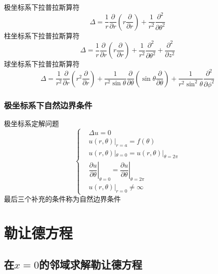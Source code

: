 \documentclass{article}
\begin{document}
极坐标系下拉普拉斯算符
\begin{equation*}
  \Delta = \dfrac{1}{r} \dfrac{\partial}{\partial r} \left( r \dfrac{\partial}{\partial r}  \right) + \dfrac{1}{r^{2}} \dfrac{\partial^{2}}{\partial \theta^{2}} 
\end{equation*}
柱坐标系下拉普拉斯算符
\begin{equation*}
  \Delta = \dfrac{1}{r} \dfrac{\partial}{\partial r} \left( r \dfrac{\partial}{\partial r}  \right) + \dfrac{1}{r^{2}} \dfrac{\partial^{2}}{\partial \theta^{2}} + \dfrac{\partial^{2}}{\partial z^{2}} 
\end{equation*}
球坐标系下拉普拉斯算符
\begin{equation*}
  \Delta = \dfrac{1}{r^{2}} \dfrac{\partial}{\partial r} \left( r^{2} \dfrac{\partial}{\partial r}  \right) + \dfrac{1}{r^{2} \sin \theta} \dfrac{\partial}{\partial \theta} \left( \sin \theta \dfrac{\partial}{\partial \theta}  \right) + \dfrac{1}{r^{2} \sin^{2} \theta} \dfrac{\partial^{2}}{\partial \phi^{2}}  
\end{equation*}

\subsubsection{极坐标系下自然边界条件}
极坐标系定解问题
\begin{equation*}
  \left\{
    \begin{aligned}
      & \Delta u = 0 \\
      & u(r,\theta )|_{r=a} = f(\theta)\\
      & u(r,\theta )|_{\theta = 0} = u(r,\theta )|_{\theta = 2\pi}\\
      & \!\!\left. \dfrac{\partial u}{\partial \theta} \right| _{\theta = 0} = \left. \dfrac{\partial u}{\partial \theta} \right| _{\theta = 2\pi}\\
      & u(r,\theta )|_{r=0} \neq \infty
    \end{aligned}
  \right.
\end{equation*}
最后三个补充的条件称为自然边界条件
\section{勒让德方程}

\subsection{在$x=0$的邻域求解勒让德方程}
\end{document}
